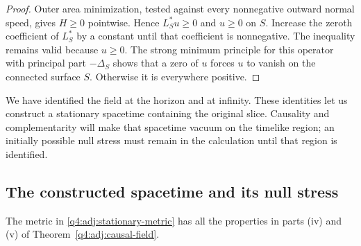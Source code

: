 \begin{proof}
Outer area minimization, tested against every nonnegative outward normal
speed, gives $H\ge0$ pointwise.  Hence $L_S^*u\ge0$ and $u\ge0$ on $S$.
Increase the zeroth coefficient of $L_S^*$ by a constant until that
coefficient is nonnegative.  The inequality remains valid because $u\ge0$.
The strong minimum principle for this operator with principal part
$-\Delta_S$ shows that a zero of $u$ forces $u$ to vanish on the connected
surface $S$.  Otherwise it is everywhere positive.
\end{proof}

We have identified the field at the horizon and at infinity. These
identities let us construct a stationary spacetime containing the original
slice. Causality and complementarity will make that spacetime vacuum on
the timelike region; an initially possible null stress must remain in the
calculation until that region is identified.

\subsection{The constructed spacetime and its null stress}

\begin{lemma}
\label{q4:adj:killing-development}
The metric in \eqref{q4:adj:stationary-metric} has all the properties in
parts \textup{(iv)} and \textup{(v)} of Theorem~\ref{q4:adj:causal-field}.
\end{lemma}

